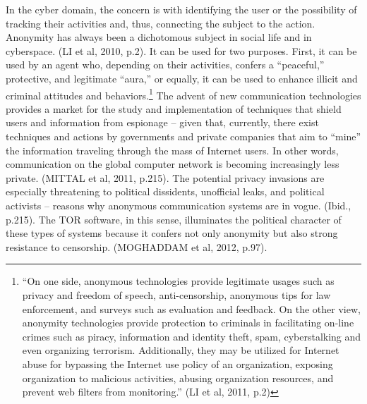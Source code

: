 In the cyber domain, the concern is with identifying the user or the possibility of tracking their activities and, thus, connecting the subject to the action. Anonymity has always been a dichotomous subject in social life and in cyberspace. (LI et al, 2010, p.2). It can be used for two purposes. First, it can be used by an agent who, depending on their activities, confers a ``peaceful,'' protective, and legitimate ``aura,'' or equally, it can be used to enhance illicit and criminal attitudes and behaviors.\footnote{``On one side, anonymous technologies provide legitimate usages such as privacy and freedom of speech, anti-censorship, anonymous tips for law enforcement, and surveys such as evaluation and feedback. On the other view, anonymity technologies provide protection to criminals in facilitating on-line crimes such as piracy, information and identity theft, spam, cyberstalking and even organizing terrorism. Additionally, they may be utilized for Internet abuse for bypassing the Internet use policy of an organization, exposing organization to malicious activities, abusing organization resources, and prevent web filters from monitoring.'' (LI et al, 2011, p.2)} The advent of new communication technologies provides a market for the study and implementation of techniques that shield users and information from espionage -- given that, currently, there exist techniques and actions by governments and private companies that aim to ``mine'' the information traveling through the mass of Internet users. In other words, communication on the global computer network is becoming increasingly less private. (MITTAL et al, 2011, p.215). The potential privacy invasions are especially threatening to political dissidents, unofficial leaks, and political activists -- reasons why anonymous communication systems are in vogue. (Ibid., p.215). The TOR software, in this sense, illuminates the political character of these types of systems because it confers not only anonymity but also strong resistance to censorship. (MOGHADDAM et al, 2012, p.97).

